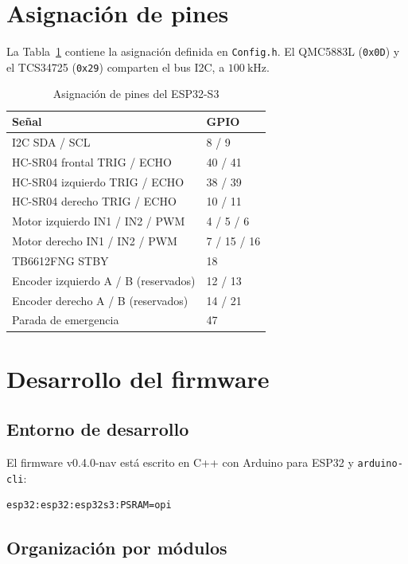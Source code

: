\documentclass[journal]{IEEEtran}
\begin{document}
\section{Asignación de pines}

La Tabla~\ref{tab:pinout} contiene la asignación definida en \texttt{Config.h}. El QMC5883L (\texttt{0x0D}) y el TCS34725 (\texttt{0x29}) comparten el bus I2C, a $100~\mathrm{kHz}$.

\begin{table}[H]
\centering
\caption{Asignación de pines del ESP32-S3}
\label{tab:pinout}
\scriptsize
\begin{tabular}{l l}
\toprule
\textbf{Señal} & \textbf{GPIO} \\
\midrule
I2C SDA / SCL & 8 / 9 \\
HC-SR04 frontal TRIG / ECHO & 40 / 41 \\
HC-SR04 izquierdo TRIG / ECHO & 38 / 39 \\
HC-SR04 derecho TRIG / ECHO & 10 / 11 \\
Motor izquierdo IN1 / IN2 / PWM & 4 / 5 / 6 \\
Motor derecho IN1 / IN2 / PWM & 7 / 15 / 16 \\
TB6612FNG STBY & 18 \\
Encoder izquierdo A / B (reservados) & 12 / 13 \\
Encoder derecho A / B (reservados) & 14 / 21 \\
Parada de emergencia & 47 \\
\bottomrule
\end{tabular}
\end{table}

\section{Desarrollo del firmware}

\subsection{Entorno de desarrollo}

El firmware v0.4.0-nav está escrito en C++ con Arduino para ESP32 \cite{ArduinoESP32} y \texttt{arduino-cli}:

\begin{lstlisting}[basicstyle=\ttfamily\scriptsize,breaklines=true]
esp32:esp32:esp32s3:PSRAM=opi
\end{lstlisting}

\subsection{Organización por módulos}
\end{document}

